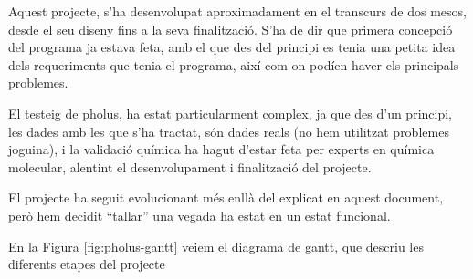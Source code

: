 Aquest projecte, s'ha desenvolupat aproximadament en el transcurs de dos mesos,
desde el seu diseny fins a la seva finalització.  S'ha de dir que primera
concepció del programa ja estava feta, amb el que des del principi es tenia una
petita idea dels requeriments que tenia el programa, així com on podíen haver
els principals problemes.

El testeig de pholus, ha estat particularment complex, ja que des d'un principi,
les dades amb les que s'ha tractat, són dades reals (no hem utilitzat problemes
joguina), i la validació química ha hagut d'estar feta per experts en química
molecular, alentint el desenvolupament i finalització  del projecte.

El projecte ha seguit evolucionant més enllà del explicat en aquest document,
però hem decidit ``tallar'' una vegada ha estat en un estat funcional.

En la Figura \ref{fig:pholus-gantt} veiem el diagrama de gantt, que descriu les
diferents etapes del projecte 

